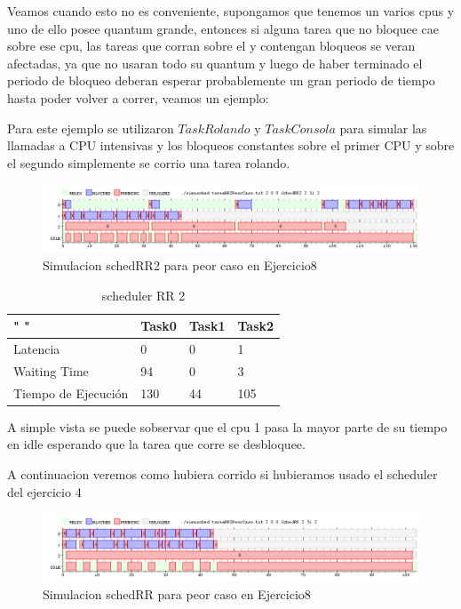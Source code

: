 \documentclass[11pt]{article}
\begin{document}
\begin{enumerate}
  Veamos cuando esto no es conveniente, supongamos que tenemos un varios cpus y uno de ello posee quantum grande, entonces si alguna tarea que no bloquee cae sobre ese cpu, las tareas que corran sobre el y contengan bloqueos se veran afectadas, ya que no usaran todo su quantum y luego de haber terminado el periodo de bloqueo deberan esperar probablemente un gran periodo de tiempo hasta poder volver a correr, veamos un ejemplo: 

  Para este ejemplo se utilizaron $TaskRolando$ y $TaskConsola$ para simular las llamadas a CPU intensivas y los bloqueos constantes sobre el primer CPU y sobre el segundo simplemente se corrio una tarea rolando.

    \begin{figure}[H]
      \includegraphics[scale=0.5]{Ej8PeorCaso}
      \caption{Simulacion schedRR2 para peor caso en Ejercicio8}
    \end{figure}

  \begin{table}[htb]
  \centering
  \begin{tabular}{| l | l | l | l |}
  \hline
  " " & Task0 & Task1 & Task2 \\
  \hline \hline
  Latencia & 0 & 0 & 1 \\ \hline
  Waiting Time & 94 & 0 & 3 \\ \hline
  Tiempo de Ejecución & 130 & 44 & 105 \\ \hline
  \end{tabular}
  \caption{scheduler RR 2}
  \end{table}

  A simple vista se puede sobservar que el cpu 1 pasa la mayor parte de su tiempo en idle esperando que la tarea que corre se desbloquee. 

  A continuacion veremos como hubiera corrido si hubieramos usado el scheduler del ejercicio 4

    \begin{figure}[H]
      \includegraphics[scale=0.5]{Ej8PeorCasoRR}
      \caption{Simulacion schedRR para peor caso en Ejercicio8}
    \end{figure}


\end{enumerate}
\end{document}
